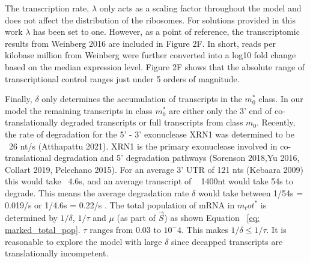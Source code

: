 \documentclass[review]{elsarticle}
\begin{document}
The transcription rate, $\lambda$ only acts as a scaling factor throughout the model and does not affect the distribution of the ribosomes. For solutions provided in this work $\lambda$ has been set to one. However, as a point of reference, the transcriptomic results from Weinberg 2016 are included in Figure 2F. In short, reads per kilobase million from Weinberg were further converted into a log10 fold change based on the median expression level. Figure 2F shows that the absolute range of transcriptional control ranges just under 5 orders of magnitude.

Finally, $\delta$ only determines the accumulation of transcripts in the  $m_0^*$  class. In our model the remaining transcripts in class $m_0^*$ are either only the 3' end of co-translationally degraded transcripts or full transcripts from class $m_0$. Recently, the rate of degradation for the 5' - 3' exonuclease XRN1 was determined to be ~26 nt/s (Atthapattu 2021). XRN1 is the primary exonuclease involved in co-translational degradation and  5' degradation pathways (Sorenson 2018,Yu 2016, Collart 2019, Pelechano 2015). For an average 3' UTR of 121 nts (Kebaara 2009) this would take ~4.6s, and an average transcript of ~ 1400nt would take 54s to degrade.  This means the average degradation rate $\delta$ would take between 1/54s = 0.019/s or 1/4.6s = 0.22/s . The total population of mRNA in $m_tot^*$ is determined by $1/\delta$, $1/\tau$ and $\mu$ (as part of $\vec{S}$) as shown Equation  ~\ref{eq:  marked_total_pop}. $\tau$ ranges from 0.03 to $10^-4$. This makes $1/\delta \leq 1/\tau$. It is reasonable to explore the model with large $\delta$ since decapped transcripts are translationally incompetent. 
 
\end{document}
